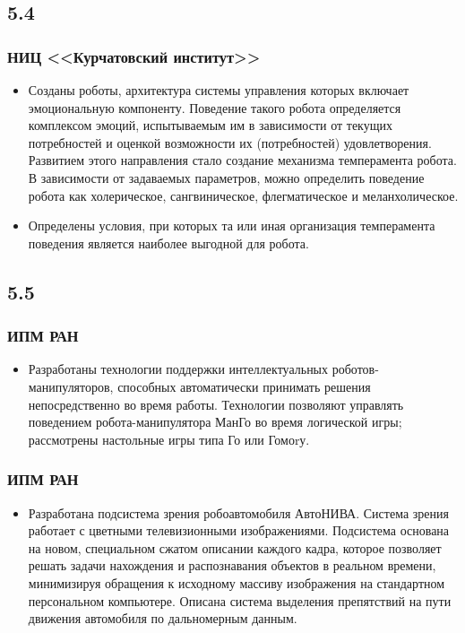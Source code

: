 \documentclass[default]{beamer}
\begin{document}
	\subsection{5.4}
	\begin{frame}
		\frametitle{НИЦ <<Курчатовский институт>>}

		\begin{itemize}
			\item Созданы роботы, архитектура системы управления которых включает эмоциональную компоненту. Поведение такого робота определяется комплексом эмоций, испытываемым им в зависимости от текущих потребностей и оценкой возможности их (потребностей) удовлетворения. Развитием этого направления стало создание механизма темперамента робота. В зависимости от задаваемых параметров, можно определить поведение робота как холерическое, сангвиническое, флегматическое и меланхолическое. 
			\item Определены условия, при которых та или иная организация темперамента поведения является наиболее выгодной для робота. 
			
		\end{itemize}
	\end{frame}
	
	\subsection{5.5}
	\begin{frame}
		\frametitle{ИПМ РАН}
		\Large
		\begin{itemize}
			\item Разработаны технологии поддержки интеллектуальных роботов-манипуляторов, способных автоматически принимать решения непосредственно во время работы. Технологии позволяют управлять поведением робота-манипулятора МанГо во время логической игры; рассмотрены настольные игры типа Го или Гомоrу. 
		\end{itemize}
	\end{frame}

	\begin{frame}
		\frametitle{ИПМ РАН}
		
		\begin{itemize}
			\item Разработана подсистема зрения робоавтомобиля АвтоНИВА. Система зрения работает с цветными телевизионными изображениями. Подсистема основана на новом, специальном сжатом описании каждого кадра, которое позволяет решать задачи нахождения и распознавания объектов в реальном времени, минимизируя обращения к исходному массиву изображения на стандартном персональном компьютере. Описана система выделения препятствий на пути движения автомобиля по дальномерным данным. 
		\end{itemize}
	\end{frame}
\end{document}
